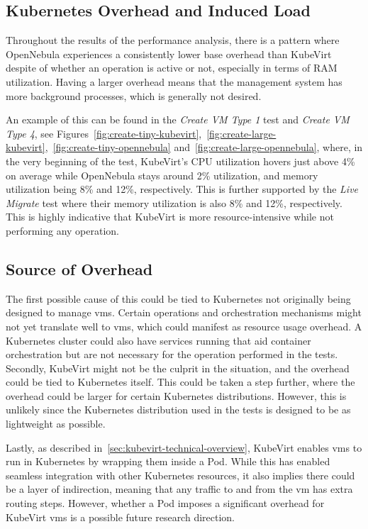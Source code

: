 \documentclass{kththesis}
\begin{document}
\begin{enumerate}
\section{Kubernetes Overhead and Induced Load}
\label{overhead-vs-induced-load}
Throughout the results of the performance analysis, there is a pattern where OpenNebula experiences a consistently lower base overhead than KubeVirt despite of whether an operation is active or not, especially in terms of RAM utilization. Having a larger overhead means that the management system has more background processes, which is generally not desired. 

An example of this can be found in the \textit{Create VM Type 1} test and \textit{Create VM Type 4}, see Figures\ \ref{fig:create-tiny-kubevirt},\ \ref{fig:create-large-kubevirt},\ \ref{fig:create-tiny-opennebula} and\ \ref{fig:create-large-opennebula}, where, in the very beginning of the test, KubeVirt's CPU utilization hovers just above 4\% on average while OpenNebula stays around 2\% utilization, and memory utilization being 8\% and 12\%, respectively. This is further supported by the \textit{Live Migrate} test where their memory utilization is also 8\% and 12\%, respectively. This is highly indicative that KubeVirt is more resource-intensive while not performing any operation.

\subsection{Source of Overhead}
The first possible cause of this could be tied to Kubernetes not originally being designed to manage \Glspl{vm}. Certain operations and orchestration mechanisms might not yet translate well to \Glspl{vm}, which could manifest as resource usage overhead. A Kubernetes cluster could also have services running that aid container orchestration but are not necessary for the operation performed in the tests. 
Secondly, KubeVirt might not be the culprit in the situation, and the overhead could be tied to Kubernetes itself. This could be taken a step further, where the overhead could be larger for certain Kubernetes distributions. However, this is unlikely since the Kubernetes distribution used in the tests is designed to be as lightweight as possible.

Lastly, as described in\ \ref{sec:kubevirt-technical-overview}, KubeVirt enables \Glspl{vm} to run in Kubernetes by wrapping them inside a Pod. While this has enabled seamless integration with other Kubernetes resources, it also implies there could be a layer of indirection, meaning that any traffic to and from the \Gls{vm} has extra routing steps. However, whether a Pod imposes a significant overhead for KubeVirt \Glspl{vm} is a possible future research direction. 


\end{enumerate}
\end{document}
